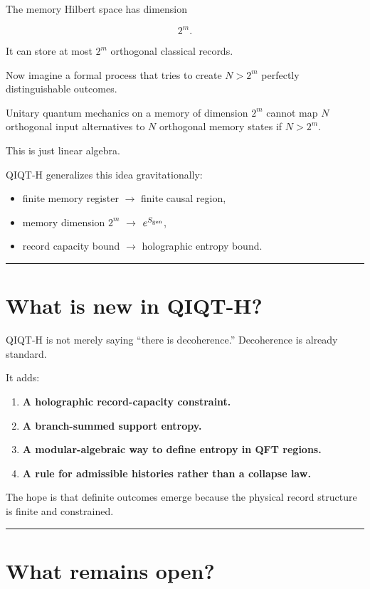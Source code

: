 \documentclass[11pt,a4paper]{article}
\begin{document}
The memory Hilbert space has dimension

\[
2^m.
\]

It can store at most $2^m$ orthogonal classical records.

Now imagine a formal process that tries to create $N>2^m$ perfectly distinguishable outcomes.

Unitary quantum mechanics on a memory of dimension $2^m$ cannot map $N$ orthogonal input alternatives to $N$ orthogonal memory states if $N>2^m$.

This is just linear algebra.

QIQT-H generalizes this idea gravitationally:

\begin{itemize}
  \item finite memory register $\rightarrow$ finite causal region,
  \item memory dimension $2^m$ $\rightarrow$ $e^{S_{\rm gen}}$,
  \item record capacity bound $\rightarrow$ holographic entropy bound.
\end{itemize}

\medskip\hrule\medskip

\section{What is new in QIQT-H?}

QIQT-H is not merely saying “there is decoherence.” Decoherence is already standard.

It adds:

\begin{enumerate}
  \item \textbf{A holographic record-capacity constraint.}
  \item \textbf{A branch-summed support entropy.}
  \item \textbf{A modular-algebraic way to define entropy in QFT regions.}
  \item \textbf{A rule for admissible histories rather than a collapse law.}
\end{enumerate}

The hope is that definite outcomes emerge because the physical record structure is finite and constrained.

\medskip\hrule\medskip

\section{What remains open?}
\end{document}
